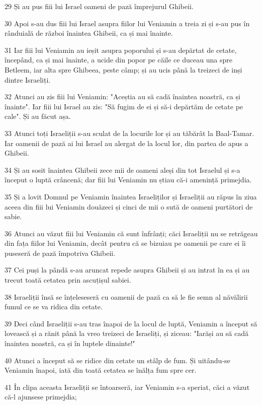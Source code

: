 \par 29 Și au pus fiii lui Israel oameni de pază împrejurul Ghibeii.
\par 30 Apoi s-au dus fiii lui Israel asupra fiilor lui Veniamin a treia zi și s-au pus în rânduială de război înaintea Ghibeii, ca și mai înainte.
\par 31 Iar fiii lui Veniamin au ieșit asupra poporului și s-au depărtat de cetate, începând, ca și mai înainte, a ucide din popor pe căile ce duceau una spre Betleem, iar alta spre Ghibeea, peste câmp; și au ucis până la treizeci de inși dintre Israeliți.
\par 32 Atunci au zis fiii lui Veniamin: "Aceștia au să cadă înaintea noastră, ca și înainte". Iar fiii lui Israel au zis: "Să fugim de ei și să-i depărtăm de cetate pe cale". Și au făcut așa.
\par 33 Atunci toți Israeliții s-au sculat de la locurile lor și au tăbărât la Baal-Tamar. Iar oamenii de pază ai lui Israel au alergat de la locul lor, din partea de apus a Ghibeii.
\par 34 Și au sosit înaintea Ghibeii zece mii de oameni aleși din tot Israelul și s-a început o luptă crâncenă; dar fiii lui Veniamin nu știau că-i amenință primejdia.
\par 35 Și a lovit Domnul pe Veniamin înaintea Israeliților și Israeliții au răpus în ziua aceea din fiii lui Veniamin douăzeci și cinci de mii o sută de oameni purtători de sabie.
\par 36 Atunci au văzut fiii lui Veniamin că sunt înfrânți; căci Israeliții nu se retrăgeau din fața fiilor lui Veniamin, decât pentru că se bizuiau pe oamenii pe care ei îi puseseră de pază împotriva Ghibeii.
\par 37 Cei puși la pândă s-au aruncat repede asupra Ghibeii și au intrat în ea și au trecut toată cetatea prin ascuțișul sabiei.
\par 38 Israeliții însă se înțeleseseră cu oamenii de pază ca să le fie semn al năvălirii fumul ce se va ridica din cetate.
\par 39 Deci când Israeliții s-au tras înapoi de la locul de luptă, Veniamin a început să lovească și a rănit până la vreo treizeci de Israeliți, și ziceau: "Iarăși au să cadă înaintea noastră, ca și în luptele dinainte!"
\par 40 Atunci a început să se ridice din cetate un stâlp de fum. Și uitându-se Veniamin înapoi, iată din toată cetatea se înălța fum spre cer.
\par 41 În clipa aceasta Israeliții se întoarseră, iar Veniamin s-a speriat, căci a văzut că-l ajunsese primejdia;
